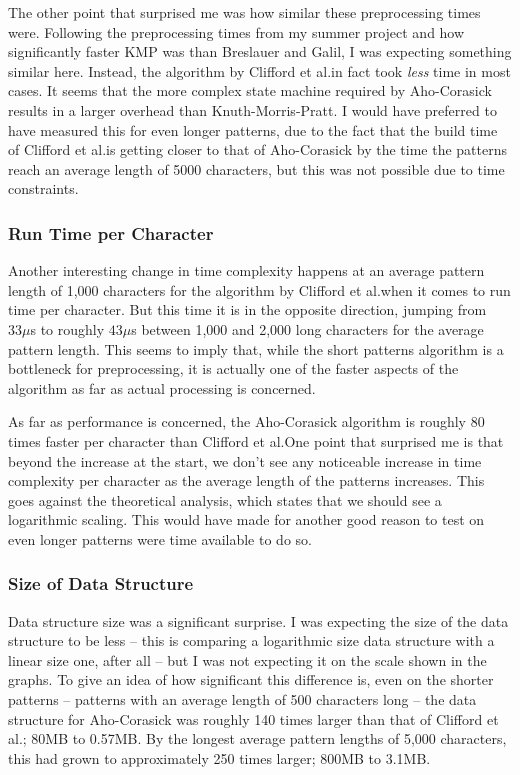 \documentclass[ %
                    author={Dominic Joseph Moylett},
                    degree={MEng},
                     title={Dictionary Matching with Fingerprints},
                  subtitle={An Empirical Analysis},
                      type={research},
                      year={2015} ]{dissertation}
\begin{document}
The other point that surprised me was how similar these preprocessing times were. Following the preprocessing times from my summer project and how significantly faster KMP was than Breslauer and Galil, I was expecting something similar here. Instead, the algorithm by Clifford et al.\@ in fact took \textit{less} time in most cases. It seems that the more complex state machine required by Aho-Corasick results in a larger overhead than Knuth-Morris-Pratt. I would have preferred to have measured this for even longer patterns, due to the fact that the build time of Clifford et al.\@ is getting closer to that of Aho-Corasick by the time the patterns reach an average length of 5000 characters, but this was not possible due to time constraints.

\subsubsection{Run Time per Character}

Another interesting change in time complexity happens at an average pattern length of 1,000 characters for the algorithm by Clifford et al.\@ when it comes to run time per character. But this time it is in the opposite direction, jumping from $33\mu$s to roughly $43\mu$s between 1,000 and 2,000 long characters for the average pattern length. This seems to imply that, while the short patterns algorithm is a bottleneck for preprocessing, it is actually one of the faster aspects of the algorithm as far as actual processing is concerned.

As far as performance is concerned, the Aho-Corasick algorithm is roughly 80 times faster per character than Clifford et al.\@ One point that surprised me is that beyond the increase at the start, we don't see any noticeable increase in time complexity per character as the average length of the patterns increases. This goes against the theoretical analysis, which states that we should see a logarithmic scaling. This would have made for another good reason to test on even longer patterns were time available to do so.

\subsubsection{Size of Data Structure}

Data structure size was a significant surprise. I was expecting the size of the data structure to be less -- this is comparing a logarithmic size data structure with a linear size one, after all -- but I was not expecting it on the scale shown in the graphs. To give an idea of how significant this difference is, even on the shorter patterns -- patterns with an average length of 500 characters long -- the data structure for Aho-Corasick was roughly 140 times larger than that of Clifford et al.; 80MB to 0.57MB. By the longest average pattern lengths of 5,000 characters, this had grown to approximately 250 times larger; 800MB to 3.1MB.
\end{document}
